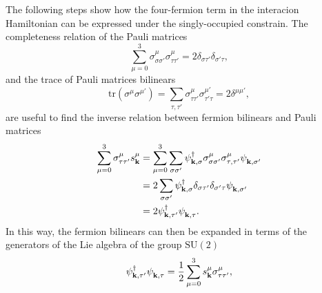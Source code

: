 \documentclass[english,aps,prd,nofootinbib,twocolumn]{revtex4-1}
\begin{document}
The following steps show how the four-fermion term in the interacion Hamiltonian can be expressed under the singly-occupied constrain. The completeness relation of the Pauli matrices
\begin{equation}
\sum_{\mu=0}^{3} 
\sigma^{\mu }_{\sigma \sigma'}\sigma^{\mu }_{\tau \tau'} =  
2 \delta_{\sigma \tau'} \delta_{\sigma'\tau },
\end{equation}
and the trace of Pauli matrices bilinears 
\begin{equation}
\mathrm{tr}\left( \sigma^{\mu }\sigma^{\mu'} \right) = 
\sum_{\tau ,\tau'}
\sigma^{\mu }_{\tau \tau'}\sigma^{\mu'}_{\tau'\tau } = 
2 \delta^{\mu \mu'},
\end{equation}
are useful to find the inverse relation between fermion bilinears and Pauli matrices
\begin{equation}
\begin{split}
\sum_{\mu=0}^{3} 
\sigma^{\mu }_{\tau \tau'}s^{\mu}_{\mathbf{k }} &= 
\sum_{\mu=0}^{3} \sum_{\sigma \sigma'} 
\psi_{\mathbf{k ,\sigma }}^{\textcolor{black}{\dagger}}
\sigma^{\mu }_{\sigma \sigma'}\sigma^{\mu }_{\tau ,\tau'}
\psi_{\mathbf{k ,\sigma'}}^{\textcolor{white}{\dagger}} \\ &= 
2
\sum_{\sigma \sigma'} 
\psi_{\mathbf{k ,\sigma }}^{\textcolor{black}{\dagger}}
\delta_{\sigma \tau'} \delta_{\sigma'\tau }
\psi_{\mathbf{k ,\sigma'}}^{\textcolor{white}{\dagger}} \\ &= 
2
\psi_{\mathbf{k ,\tau'}}^{\textcolor{black}{\dagger}}
\psi_{\mathbf{k ,\tau }}^{\textcolor{white}{\dagger}} .
\end{split}
\end{equation}
In this way, the fermion bilinears can then be expanded in terms of the generators of the Lie algebra of the group $\mathrm{SU}(2)$
\begin{equation}
\label{eq:SU(2)-expansion-of-fermion-bilinears}
\psi_{\mathbf{k ,\tau'}}^{\textcolor{black}{\dagger}}
\psi_{\mathbf{k ,\tau }}^{\textcolor{white}{\dagger}} = 
\frac{1}{2}
\sum_{\mu=0}^{3} 
s^{\mu }_{\mathbf{k }}\sigma^{\mu }_{\tau \tau'},
\end{equation}
\end{document}
